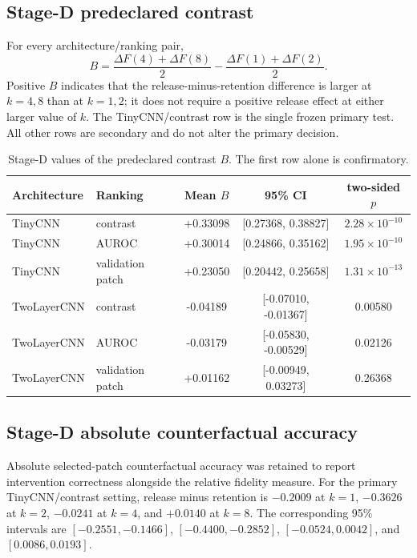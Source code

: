 \subsection{Stage-D predeclared contrast}\label{app:stage-d-b}

For every architecture/ranking pair,
\[
B=\frac{\Delta F(4)+\Delta F(8)}{2}-\frac{\Delta F(1)+\Delta F(2)}{2}.
\]
Positive $B$ indicates that the release-minus-retention difference is larger at $k=4,8$ than at $k=1,2$; it does not require a positive release effect at either larger value of $k$. The TinyCNN/contrast row is the single frozen primary test. All other rows are secondary and do not alter the primary decision.

\begin{table}[h]
\caption{Stage-D values of the predeclared contrast $B$. The first row alone is confirmatory.}
\label{tab:stage-d-b}
\centering
\small
\begin{tabular}{llccc}
\toprule
Architecture & Ranking & Mean $B$ & 95\% CI & two-sided $p$ \\
\midrule
TinyCNN & contrast & +0.33098 & [0.27368, 0.38827] & $2.28\times10^{-10}$ \\
TinyCNN & AUROC & +0.30014 & [0.24866, 0.35162] & $1.95\times10^{-10}$ \\
TinyCNN & validation patch & +0.23050 & [0.20442, 0.25658] & $1.31\times10^{-13}$ \\
TwoLayerCNN & contrast & -0.04189 & [-0.07010, -0.01367] & 0.00580 \\
TwoLayerCNN & AUROC & -0.03179 & [-0.05830, -0.00529] & 0.02126 \\
TwoLayerCNN & validation patch & +0.01162 & [-0.00949, 0.03273] & 0.26368 \\
\bottomrule
\end{tabular}
\end{table}

\subsection{Stage-D absolute counterfactual accuracy}\label{app:stage-d-cf}

Absolute selected-patch counterfactual accuracy was retained to report intervention correctness alongside the relative fidelity measure. For the primary TinyCNN/contrast setting, release minus retention is $-0.2009$ at $k=1$, $-0.3626$ at $k=2$, $-0.0241$ at $k=4$, and $+0.0140$ at $k=8$. The corresponding 95\% intervals are $[-0.2551,-0.1466]$, $[-0.4400,-0.2852]$, $[-0.0524,0.0042]$, and $[0.0086,0.0193]$.

